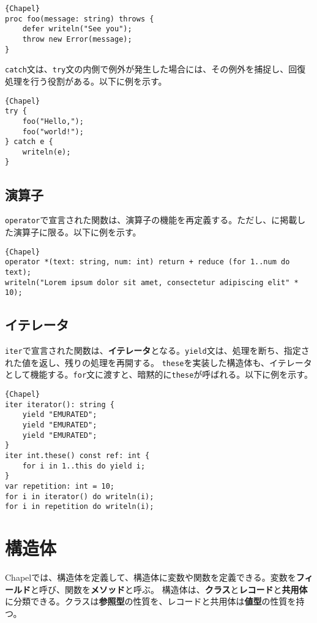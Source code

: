 \documentclass[10pt,a4paper]{book}
\begin{document}
\begin{Verbatim}{Chapel}
proc foo(message: string) throws {
	defer writeln("See you");
	throw new Error(message);
}
\end{Verbatim}

\texttt{catch}文は、\texttt{try}文の内側で例外が発生した場合には、その例外を捕捉し、回復処理を行う役割がある。以下に例を示す。

\begin{Verbatim}{Chapel}
try {
	foo("Hello,");
	foo("world!");
} catch e {
	writeln(e);
}
\end{Verbatim}

\section{演算子}

\texttt{operator}で宣言された関数は、演算子の機能を再定義する。ただし、に掲載した演算子に限る。以下に例を示す。

\begin{Verbatim}{Chapel}
operator *(text: string, num: int) return + reduce (for 1..num do text);
writeln("Lorem ipsum dolor sit amet, consectetur adipiscing elit" * 10);
\end{Verbatim}

\section{イテレータ}

\texttt{iter}で宣言された関数は、\textbf{イテレータ}となる。\texttt{yield}文は、処理を断ち、指定された値を返し、残りの処理を再開する。
\texttt{these}を実装した構造体も、イテレータとして機能する。\texttt{for}文に渡すと、暗黙的に\texttt{these}が呼ばれる。以下に例を示す。

\begin{Verbatim}{Chapel}
iter iterator(): string {
	yield "EMURATED";
	yield "EMURATED";
	yield "EMURATED";
}
iter int.these() const ref: int {
	for i in 1..this do yield i;
}
var repetition: int = 10;
for i in iterator() do writeln(i);
for i in repetition do writeln(i);
\end{Verbatim}

\chapter{構造体\label{chap:class}}

Chapelでは、構造体を定義して、構造体に変数や関数を定義できる。変数を\textbf{フィールド}と呼び、関数を\textbf{メソッド}と呼ぶ。
構造体は、\textbf{クラス}と\textbf{レコード}と\textbf{共用体}に分類できる。クラスは\textbf{参照型}の性質を、レコードと共用体は\textbf{値型}の性質を持つ。
\end{document}
